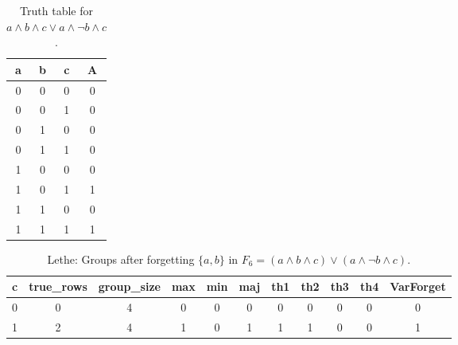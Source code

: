 \begin{table}[!tb]
    \centering
    \begin{tabular}{|c|c|c|c|}
        \hline
        \textbf{a} & \textbf{b} & \textbf{c} & \textbf{A} \\ \hline
        0 & 0 & 0 & 0 \\ \hline
        0 & 0 & 1 & 0 \\ \hline
        0 & 1 & 0 & 0 \\ \hline
        0 & 1 & 1 & 0 \\ \hline
        1 & 0 & 0 & 0 \\ \hline
        1 & 0 & 1 & 1 \\ \hline
        1 & 1 & 0 & 0 \\ \hline
        1 & 1 & 1 & 1 \\ \hline
    \end{tabular}
    \caption{Truth table for $a \land b \land c \lor a \land \lnot b \land c$.}
    \label{tab:truthtab}
\end{table}

\begin{table}[!tb]
    \centering
    \begin{tabular}{|c|c|c|c|c|c|c|c|c|c|c|}
        \hline
        \textbf{c} & \textbf{true\_rows} & \textbf{group\_size} & \textbf{max} & \textbf{min} & \textbf{maj} & \textbf{th1} & \textbf{th2} & \textbf{th3} & \textbf{th4} & \textbf{VarForget} \\ \hline
        \rowcolor{gray!40} 0 & 0 & 4 & 0 & 0 & 0 & 0 & 0 & 0 & 0 & 0 \\ \hline
        \rowcolor{blue!40} 1 & 2 & 4 & 1 & 0 & 1 & 1 & 1 & 0 & 0 & 1 \\ \hline
    \end{tabular}
    \caption{Lethe: Groups after forgetting $\{a, b\}$ in $F_{6} = (a \land b \land c) \lor (a \land \lnot b \land c)$.}
    \label{tab:lethe-F6-ab-groups}
\end{table}
